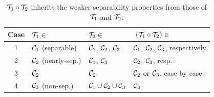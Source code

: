 \begin{table}
\begin{center}
\begin{tabular}{c|l|l|l}
\hline
Case & ${\mathcal{T}}_1\in$ & ${\mathcal{T}}_2\in$ & $~({\mathcal{T}}_1\circ{\mathcal{T}}_2)\in ~$\\\hline\hline
1 & ${\mathcal{C}}_1$ (separable) & ${\mathcal{C}}_1$, ${\mathcal{C}}_2$, ${\mathcal{C}}_3$ & ${\mathcal{C}}_1$, ${\mathcal{C}}_2$, ${\mathcal{C}}_3$, respectively \\\hline
2 & ${\mathcal{C}}_2$ (nearly-sep.)& ${\mathcal{C}}_1$, ${\mathcal{C}}_3$ & ${\mathcal{C}}_2$, ${\mathcal{C}}_3$, resp. \\\hline
3 & ${\mathcal{C}}_2$ & ${\mathcal{C}}_2$ & ${\mathcal{C}}_2$ or ${\mathcal{C}}_3$, case by case \\\hline
4 & ${\mathcal{C}}_3$ (non-sep.) & ${\mathcal{C}}_1\cup{\mathcal{C}}_2\cup{\mathcal{C}}_3$ & ${\mathcal{C}}_3$ \\\hline
\end{tabular}\end{center}
\caption{${\mathcal{T}}_1\circ{\mathcal{T}}_2$ inherits the weaker separability properties from those of ${\mathcal{T}}_1$ and ${\mathcal{T}}_2$.}\label{table:comp1-op}\end{table}


